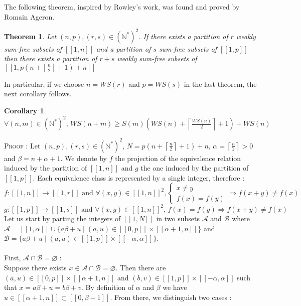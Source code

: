 \documentclass{article}
\newtheorem{theorem}{Theorem}[section]
\newtheorem{computational theorem}{Computational Theorem}[section]
\newtheorem{corollary}{Corollary}[theorem]
\begin{document}
The following theorem, inspired by Rowley's work, was found and proved by Romain Ageron.
\begin{theorem}
Let $(n,p), (r,s) \in (\mathbb{N}^*)^2$. If there exists a partition of $r$ weakly sum-free subsets of $[\![1,n]\!]$ and a partition of $s$ sum-free 
subsets of $[\![1,p]\!]$ then there exists a partition of $r+s$ weakly sum-free subsets of $[\![1,p(n+\left \lceil \frac{n}{2} \right \rceil + 1)+n]\!]$
\end{theorem}
In particular, if we choose $n = WS(r)$ and $p = WS(s)$ in the last theorem, the next corollary follows.
\begin{corollary}
$ \forall (n,m) \in (\mathbb{N}^*)^2 \text{, } WS(n+m) \geqslant S(m) \left (WS(n) + \left \lceil \frac{WS(n)}{2} \right \rceil +1 \right) + WS(n)$
\end{corollary}
\textsc{Proof :} Let $(n,p), (r,s) \in (\mathbb{N}^*)^2$,  $N = p(n+\left \lceil \frac{n}{2} \right \rceil + 1)+n$, $\alpha = \left \lceil \frac{n}{2} \right \rceil > 0$ and $\beta = n + \alpha + 1$. We denote by $f$ the projection of the equivalence relation induced by the partition of $[\![1,n]\!]$ and $g$ the one induced by the partition of $[\![1,p]\!]$. Each equivalence class is represented by a single integer, therefore :
\[ f : [\![1,n]\!] \longrightarrow [\![1,r]\!] \text{ and } \forall (x,y) \in [\![1,n]\!]^2, \left\{
    \begin{array}{ll}
        x \neq y \\
        f(x) = f(y)
    \end{array}
\right.
\Longrightarrow f(x+y) \neq f(x)
\]
\[g : [\![1,p]\!] \longrightarrow [\![1,s]\!] \text{ and } \forall (x,y) \in [\![1,n]\!]^2 \text{, } f(x) = f(y) \Longrightarrow f(x+y) \neq f(x)
\]
Let us start by parting the integers of $[\![1,N]\!]$ in two subsets $\mathcal{A}$ and $\mathcal{B}$ where $\mathcal{A} = [\![1,\alpha]\!] \cup \{a\beta + u \mid (a,u) \in [\![0,p]\!] \times [\![\alpha + 1,n]\!]\}$ and $\mathcal{B} = \{a\beta + u \mid (a,u) \in [\![1,p]\!] \times [\![-\alpha,\alpha]\!]\}$.\\
\\
First, \underline{$\mathcal{A} \cap \mathcal{B} = \varnothing$} : \\
Suppose there exists $x \in \mathcal{A} \cap \mathcal{B} = \varnothing$. Then there are $(a,u) \in [\![0,p]\!] \times [\![\alpha + 1,n]\!]$ and $(b,v) \in [\![1,p]\!] \times [\![-\alpha,\alpha]\!]$ such that $x = a\beta + u = b\beta +v$. By definition of $\alpha$ and  $\beta$ we have $u \in [\![\alpha + 1,n]\!] \subset [\![0,\beta - 1]\!]$. From there, we distinguish two cases :
\end{document}
